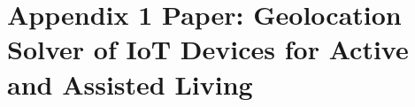 \chapter{Appendix 1 Paper: Geolocation Solver of IoT Devices for Active and Assisted Living }
\label{app:paper}


